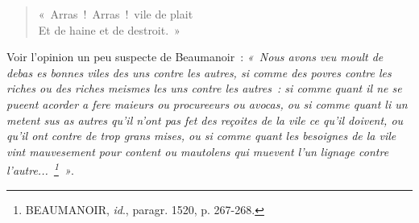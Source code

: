 \documentclass[french,twoside]{book} %
\begin{document}
\begin{verse}
« Arras ! Arras ! vile de plait\\
Et de haine et de destroit. »\\
\end{verse}

\noindent Voir l’opinion un peu suspecte de Beaumanoir : \emph{« Nous avons veu moult de debas es bonnes viles des uns contre les autres, si comme des povres contre les riches ou des riches meismes les uns contre les autres : si comme quant il ne se pueent acorder a fere maieurs ou procureeurs ou avocas, ou si comme quant li un metent sus as autres qu’il n’ont pas fet des reçoites de la vile ce qu’il doivent, ou qu’il ont contre de trop grans mises, ou si comme quant les besoignes de la vile vint mauvesement pour content ou mautolens qui muevent l’un lignage contre l’autre... \footnote{ BEAUMANOIR, {\itshape id}., paragr. 1520, p. 267-268.} »}.
\end{document}
